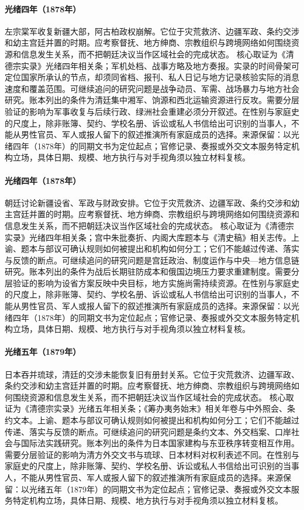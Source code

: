 \hypertarget{public:EQ-1878-Zuo-ZONGTANG-XINJIANG}{}\paragraph{光绪四年（1878年）}左宗棠军收复新疆大部，阿古柏政权崩解。它位于灾荒救济、边疆军政、条约交涉和幼主宫廷并置的时期。应考察督抚、地方绅商、宗教组织与跨境网络如何围绕资源和信息发生关系，而不把朝廷决议当作区域社会的完成状态。 核心取证为《清德宗实录》光绪四年相关条；军机处档、战事方略及地方奏报。实录的时间骨架可定位国家所承认的节点，却须同省档、报刊、私人日记与地方记录核验实际的消息速度和覆盖范围。可继续追问的研究问题是战争动员、军需、战场暴力与地方社会研究。账本列出的条件为清廷集中湘军、饷源和西北运输资源进行反攻。需要分层验证的影响为军事收复与后续行政、绿洲社会重建必须分开叙述。在性别与家庭史的尺度上，除非账簿、契约、学校名册、诉讼或私人书信给出可识别的当事人，不能从男性官员、军人或报人留下的叙述推演所有家庭成员的选择。来源保留：以光绪四年（1878年）的同期文书为定位起点；官修记录、奏报或外交文本服务特定机构立场，具体日期、规模、地方执行与对手视角须以独立材料复核。
\hypertarget{public:EQ-1878-XINJIANG-PROVINCE-DEBATE}{}\paragraph{光绪四年（1878年）}朝廷讨论新疆设省、军政与财政安排。它位于灾荒救济、边疆军政、条约交涉和幼主宫廷并置的时期。应考察督抚、地方绅商、宗教组织与跨境网络如何围绕资源和信息发生关系，而不把朝廷决议当作区域社会的完成状态。 核心取证为《清德宗实录》光绪四年相关条；宫中朱批奏折、内阁大库题本与《清史稿》相关志传。上谕、题本与部议可确认规则如何被提出和机构如何分工；它们不能越过传递、落实与反馈的断点。可继续追问的研究问题是宫廷政治、制度运作与中央—地方信息链研究。账本列出的条件为战后长期驻防成本和俄国边境压力要求重建制度。需要分层验证的影响为设省方案反映中央目标，地方实施尚需持续资源。在性别与家庭史的尺度上，除非账簿、契约、学校名册、诉讼或私人书信给出可识别的当事人，不能从男性官员、军人或报人留下的叙述推演所有家庭成员的选择。来源保留：以光绪四年（1878年）的同期文书为定位起点；官修记录、奏报或外交文本服务特定机构立场，具体日期、规模、地方执行与对手视角须以独立材料复核。
\hypertarget{public:EQ-1879-RYUKYU-ANNEXATION}{}\paragraph{光绪五年（1879年）}日本吞并琉球，清廷的交涉未能恢复旧有册封关系。它位于灾荒救济、边疆军政、条约交涉和幼主宫廷并置的时期。应考察督抚、地方绅商、宗教组织与跨境网络如何围绕资源和信息发生关系，而不把朝廷决议当作区域社会的完成状态。 核心取证为《清德宗实录》光绪五年相关条；《筹办夷务始末》相关年卷与中外照会、条约文本。上谕、题本与部议可确认规则如何被提出和机构如何分工；它们不能越过传递、落实与反馈的断点。可继续追问的研究问题是条约文本、外交档案、口岸社会与国际法实践研究。账本列出的条件为日本国家建构与东亚秩序转变相互作用。需要分层验证的影响为清方外交文书与琉球、日本材料对权利表述不同。在性别与家庭史的尺度上，除非账簿、契约、学校名册、诉讼或私人书信给出可识别的当事人，不能从男性官员、军人或报人留下的叙述推演所有家庭成员的选择。来源保留：以光绪五年（1879年）的同期文书为定位起点；官修记录、奏报或外交文本服务特定机构立场，具体日期、规模、地方执行与对手视角须以独立材料复核。
